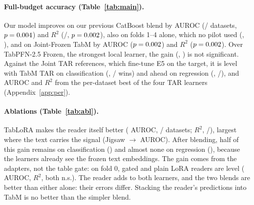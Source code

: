 \documentclass{article}
\begin{document}
\begin{table}[t]
\caption{Full-budget accuracy, dataset means (folds averaged per dataset).
W/T/L: datasets where Ours wins, ties or loses against that row; $^{*}$: two-sided Wilcoxon $p<0.05$ (local rows only).
$^{\dagger n}$: available for $n$ datasets only; [ ]: Ours on those $n$.}
\label{tab:main}
\centering
\footnotesize

\end{table}

\paragraph{Full-budget accuracy (Table~\ref{tab:main}).}
Our model improves on our previous CatBoost blend by \oursVsVoneClsDelta{} AUROC (\oursVsVoneClsWins/\oursVsVoneClsN{} datasets, $p=0.004$) and \oursVsVoneRegDelta{} $R^2$ (\oursVsVoneRegWins/\oursVsVoneRegN, $p=0.002$), also on folds 1--4 alone, which no pilot used (\noPilotVsVoneClsDelta, \noPilotVsVoneRegDelta), and on Joint-Frozen TabM by \oursVsTabMClsDelta{} AUROC ($p=0.002$) and \oursVsTabMRegDelta{} $R^2$ ($p=0.002$).
Over TabPFN-2.5 Frozen, the strongest local learner, the gain (\oursVsPFNClsDelta, \oursVsPFNRegDelta) is not significant.
Against the Joint TAR references, which fine-tune E5 on the target, it is level with TabM TAR on classification (\oursVsLbTabMTarClsDelta, \oursVsLbTabMTarClsWins/\oursVsLbTabMTarClsN{} wins) and ahead on regression (\oursVsLbTabMTarRegDelta, \oursVsLbTabMTarRegWins/\oursVsLbTabMTarRegN), and \oursVsLbBestTarClsDelta{} AUROC and \oursVsLbBestTarRegDelta{} $R^2$ from the per-dataset best of the four TAR learners (Appendix~\ref{app:per}).

\begin{table}[t]
\caption{Where the gains come from: dataset-level mean difference, wins and Wilcoxon $p$ (all five folds unless noted).}
\label{tab:abl}
\centering
\footnotesize
\setlength{\tabcolsep}{4pt}

\end{table}

\paragraph{Ablations (Table~\ref{tab:abl}).}
TabLoRA makes the reader itself better (\loraReaderClsDelta{} AUROC, \loraReaderClsWins/\loraReaderClsN{} datasets; \loraReaderRegDelta{} $R^2$, \loraReaderRegWins/\loraReaderRegN), largest where the text carries the signal (Jigsaw \sJigsawToxicityR{}$\to$\sJigsawToxicityRLora{} AUROC).
After blending, half of this gain remains on classification (\loraSystemClsDelta) and almost none on regression (\loraSystemRegDelta), because the learners already see the frozen text embeddings.
The gain comes from the adapters, not the table gate: on fold 0, gated and plain LoRA readers are level (\gateClsDelta{} AUROC, \gateRegDelta{} $R^2$, both n.s.).
The reader adds to both learners, and the two blends are better than either alone: their errors differ.
Stacking the reader's predictions into TabM is no better than the simpler blend.
\end{document}
